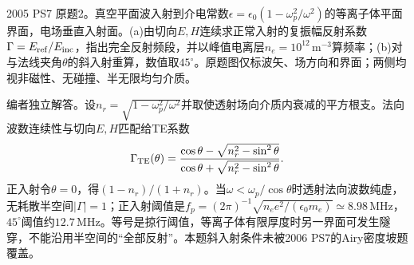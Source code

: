 \begin{exercise}\label{ex:hist05-7-2}
2005 PS7 原题2。真空平面波入射到介电常数$\epsilon=\epsilon_0(1-\omega_p^2/\omega^2)$的等离子体平面界面，电场垂直入射面。(a)由切向$E,H$连续求正常入射的复振幅反射系数$\Gamma=E_{\rm ref}/E_{\rm inc}$，指出完全反射频段，并以峰值电离层$n_e=10^{12}\,\mathrm m^{-3}$算频率；(b)对与法线夹角$\theta$的斜入射重算，数值取$45^\circ$。原题图仅标波矢、场方向和界面；两侧均视非磁性、无碰撞、半无限均匀介质。
\end{exercise}
\begin{solution}
编者独立解答。设$n_r=\sqrt{1-\omega_p^2/\omega^2}$并取使透射场向介质内衰减的平方根支。法向波数连续性与切向$E,H$匹配给TE系数
\begin{equation}
\Gamma_{\rm TE}(\theta)=\frac{\cos\theta-\sqrt{n_r^2-\sin^2\theta}}{\cos\theta+\sqrt{n_r^2-\sin^2\theta}}.
\end{equation}
正入射令$\theta=0$，得$(1-n_r)/(1+n_r)$。当$\omega<\omega_p/\cos\theta$时透射法向波数纯虚，无耗散半空间$|\Gamma|=1$；正入射阈值是$f_p=(2\pi)^{-1}\sqrt{n_ee^2/(\epsilon_0m_e)}\simeq8.98\,\mathrm{MHz}$，$45^\circ$阈值约$12.7\,\mathrm{MHz}$。等号是掠行阈值，等离子体有限厚度时另一界面可发生隧穿，不能沿用半空间的“全部反射”。本题斜入射条件未被2006 PS7的Airy密度坡题覆盖。
\end{solution}

